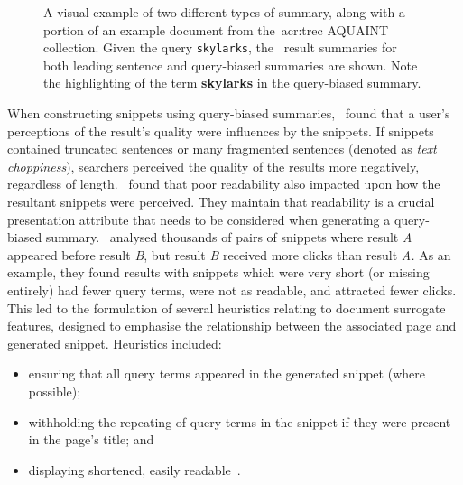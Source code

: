 \begin{figure}[t!]
    \centering
    \caption[Leading sentence and query-biased summary examples]{A visual example of two different types of summary, along with a portion of an example document from the~\gls{acr:trec} AQUAINT collection. Given the query \texttt{skylarks}, the \searchlogo~result summaries for both leading sentence and query-biased summaries are shown. Note the highlighting of the term \textbf{skylarks} in the query-biased summary.}
    \label{fig:snippet_types}
\end{figure}

When constructing snippets using query-biased summaries,~\cite{rose2007snippet_attributes} found that a user's perceptions of the result's quality were influences by the snippets. If snippets contained truncated sentences or many fragmented sentences (denoted as \emph{text choppiness}), searchers perceived the quality of the results more negatively, regardless of length.~\cite{kanungo2009snippet_readability} found that poor readability also impacted upon how the resultant snippets were perceived. They maintain that readability is a crucial presentation attribute that needs to be considered when generating a query-biased summary.~\cite{clarke2007caption_features} analysed thousands of pairs of snippets where result \emph{A} appeared before result \emph{B}, but result \emph{B} received more clicks than result \emph{A.} As an example, they found results with snippets which were very short (or missing entirely) had fewer query terms, were not as readable, and attracted fewer clicks. This led to the formulation of several heuristics relating to document surrogate features, designed to emphasise the relationship between the associated page and generated snippet. Heuristics included:

\begin{itemize}
    \item{ensuring that all query terms appeared in the generated snippet (where possible);}
    \item{withholding the repeating of query terms in the snippet if they were present in the page's title; and}
    \item{displaying shortened, easily readable~.}
\end{itemize}

